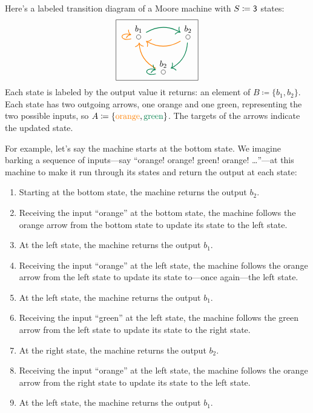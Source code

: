 \documentclass[Book-Poly]{subfiles}
\begin{document}
\begin{example}\label{ex.Moore_three}
Here's a labeled transition diagram of a Moore machine with $S\coloneqq\textsf{3}$ states:
\begin{equation} \label{eqn.trans_diag}
\begin{tikzpicture}
	\node[draw] {
  \begin{tikzcd}[column sep=small]
  	\LMO{b_1}\ar[rr, dgreen, thick, bend left]\ar[loop left, thick, orange]&&
  	\LMO{b_2}\ar[ll, thick, orange, bend left]\ar[dl, bend left, thick, dgreen]\\&
  	\LMO{b_2} \ar[ul, thick, orange, bend left] \ar[loop left, thick, dgreen]
  \end{tikzcd}
  };
\end{tikzpicture}
\end{equation}
Each state is labeled by the output value it returns: an element of $B\coloneqq\{b_1,b_2\}$. Each state has two outgoing arrows, one orange and one green, representing the two possible inputs, so $A\coloneqq\{{\color{orange}\text{orange}},{\color{dgreen}\text{green}}\}$.
The targets of the arrows indicate the updated state.

For example, let's say the machine starts at the bottom state.
We imagine barking a sequence of inputs---say ``{\color{orange}orange! orange!} {\color{dgreen}green!} {\color{orange}orange!} \ldots''---at this machine to make it run through its states and return the output at each state:
\begin{enumerate}
    \item Starting at the bottom state, the machine returns the output $b_2$.
    \item Receiving the input ``{\color{orange}orange}'' at the bottom state, the machine follows the {\color{orange}orange} arrow from the bottom state to update its state to the left state.
    \item At the left state, the machine returns the output $b_1$.
    \item Receiving the input ``{\color{orange}orange}'' at the left state, the machine follows the {\color{orange}orange} arrow from the left state to update its state to---once again---the left state.
    \item At the left state, the machine returns the output $b_1$.
    \item Receiving the input ``{\color{dgreen}green}'' at the left state, the machine follows the {\color{dgreen}green} arrow from the left state to update its state to the right state.
    \item At the right state, the machine returns the output $b_2$.
    \item Receiving the input ``{\color{orange}orange}'' at the left state, the machine follows the {\color{orange}orange} arrow from the right state to update its state to the left state.
    \item At the left state, the machine returns the output $b_1$.
    

\end{enumerate}
\end{example}
\end{document}
